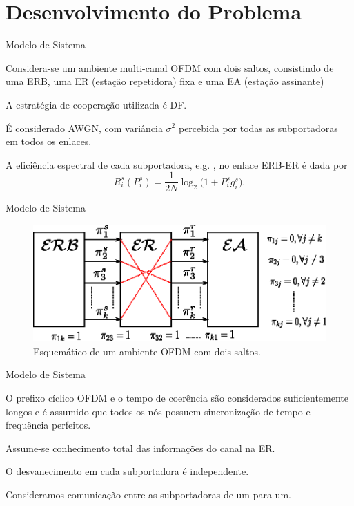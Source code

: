 \section{Desenvolvimento do Problema}\label{sec:des_prob}
\AtBeginSec

\begin{frame}{Modelo de Sistema}
   \begin{bigitem}
      \item Considera-se um ambiente multi-canal OFDM com dois saltos, consistindo de uma ERB, uma ER (estação repetidora) fixa e uma EA (estação assinante)
      \item A estratégia de cooperação utilizada é DF.      
      \item É considerado AWGN, com variância $\sigma^2$ percebida por todas as subportadoras em todos os enlaces. 
      \item A eficiência espectral de cada subportadora, e.g. , no enlace ERB-ER é dada por
        \begin{equation}\label{eq:eff_spect}
           R_i^{s}(P_i^{s}) = \frac{1}{2N}\log_2\Big(1 + P_i^{s}g_i^{s}\Big).
        \end{equation}
   \end{bigitem}
\end{frame}

\begin{frame}{Modelo de Sistema}
   \begin{figure}[!htb]
     \centering
     \includegraphics[width=0.7\linewidth]{../Imagens/schematic.eps}
     \caption{Esquemático de um ambiente OFDM com dois saltos.}\label{fig:schematic}
   \end{figure}
\end{frame}

\begin{frame}{Modelo de Sistema}
   \begin{bigitem}
      \item O prefixo cíclico OFDM e o tempo de coerência são considerados suficientemente longos e é assumido que todos os nós possuem sincronização de tempo e frequência perfeitos.
      \item Assume-se conhecimento total das informações do canal na ER.
      \item O desvanecimento em cada subportadora é independente.
      \item Consideramos comunicação entre as subportadoras de um para um.
   \end{bigitem}
\end{frame}

